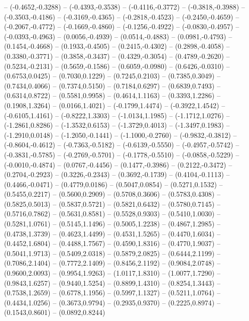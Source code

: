{	-- (-0.4652,-0.3288)
	-- (-0.4393,-0.3538)
	-- (-0.4116,-0.3772)
	-- (-0.3818,-0.3988)
	-- (-0.3503,-0.4186)
	-- (-0.3169,-0.4365)
	-- (-0.2818,-0.4523)
	-- (-0.2450,-0.4659)
	-- (-0.2067,-0.4772)
	-- (-0.1669,-0.4860)
	-- (-0.1256,-0.4922)
	-- (-0.0830,-0.4957)
	-- (-0.0393,-0.4963)
	-- (0.0056,-0.4939)
	-- (0.0514,-0.4883)
	-- (0.0981,-0.4793)
	-- (0.1454,-0.4668)
	-- (0.1933,-0.4505)
	-- (0.2415,-0.4302)
	-- (0.2898,-0.4058)
	-- (0.3380,-0.3771)
	-- (0.3858,-0.3437)
	-- (0.4329,-0.3054)
	-- (0.4789,-0.2620)
	-- (0.5234,-0.2131)
	-- (0.5659,-0.1586)
	-- (0.6059,-0.0980)
	-- (0.6426,-0.0310)
	-- (0.6753,0.0425)
	-- (0.7030,0.1229)
	-- (0.7245,0.2103)
	-- (0.7385,0.3049)
	-- (0.7434,0.4066)
	-- (0.7374,0.5150)
	-- (0.7184,0.6297)
	-- (0.6839,0.7493)
	-- (0.6314,0.8722)
	-- (0.5581,0.9958)
	-- (0.4614,1.1163)
	-- (0.3393,1.2286)
	-- (0.1908,1.3264)
	-- (0.0166,1.4021)
	-- (-0.1799,1.4474)
	-- (-0.3922,1.4542)
	-- (-0.6105,1.4161)
	-- (-0.8222,1.3303)
	-- (-1.0134,1.1985)
	-- (-1.1712,1.0276)
	-- (-1.2861,0.8286)
	-- (-1.3532,0.6153)
	-- (-1.3729,0.4013)
	-- (-1.3497,0.1983)
	-- (-1.2910,0.0148)
	-- (-1.2050,-0.1441)
	-- (-1.1000,-0.2760)
	-- (-0.9832,-0.3812)
	-- (-0.8604,-0.4612)
	-- (-0.7363,-0.5182)
	-- (-0.6139,-0.5550)
	-- (-0.4957,-0.5742)
	-- (-0.3831,-0.5785)
	-- (-0.2769,-0.5701)
	-- (-0.1778,-0.5510)
	-- (-0.0858,-0.5229)
	-- (-0.0010,-0.4874)
	-- (0.0767,-0.4456)
	-- (0.1477,-0.3986)
	-- (0.2122,-0.3472)
	-- (0.2704,-0.2923)
	-- (0.3226,-0.2343)
	-- (0.3692,-0.1739)
	-- (0.4104,-0.1113)
	-- (0.4466,-0.0471)
	-- (0.4779,0.0186)
	-- (0.5047,0.0854)
	-- (0.5271,0.1532)
	-- (0.5455,0.2217)
	-- (0.5600,0.2909)
	-- (0.5708,0.3606)
	-- (0.5783,0.4308)
	-- (0.5825,0.5013)
	-- (0.5837,0.5721)
	-- (0.5821,0.6432)
	-- (0.5780,0.7145)
	-- (0.5716,0.7862)
	-- (0.5631,0.8581)
	-- (0.5528,0.9303)
	-- (0.5410,1.0030)
	-- (0.5281,1.0761)
	-- (0.5145,1.1496)
	-- (0.5005,1.2238)
	-- (0.4867,1.2985)
	-- (0.4738,1.3739)
	-- (0.4623,1.4499)
	-- (0.4531,1.5265)
	-- (0.4470,1.6034)
	-- (0.4452,1.6804)
	-- (0.4488,1.7567)
	-- (0.4590,1.8316)
	-- (0.4770,1.9037)
	-- (0.5041,1.9713)
	-- (0.5409,2.0318)
	-- (0.5879,2.0825)
	-- (0.6444,2.1199)
	-- (0.7086,2.1404)
	-- (0.7772,2.1409)
	-- (0.8456,2.1192)
	-- (0.9084,2.0748)
	-- (0.9600,2.0093)
	-- (0.9954,1.9263)
	-- (1.0117,1.8310)
	-- (1.0077,1.7290)
	-- (0.9843,1.6257)
	-- (0.9440,1.5254)
	-- (0.8899,1.4310)
	-- (0.8254,1.3443)
	-- (0.7538,1.2659)
	-- (0.6778,1.1956)
	-- (0.5997,1.1327)
	-- (0.5211,1.0764)
	-- (0.4434,1.0256)
	-- (0.3673,0.9794)
	-- (0.2935,0.9370)
	-- (0.2225,0.8974)
	-- (0.1543,0.8601)
	-- (0.0892,0.8244)
}
